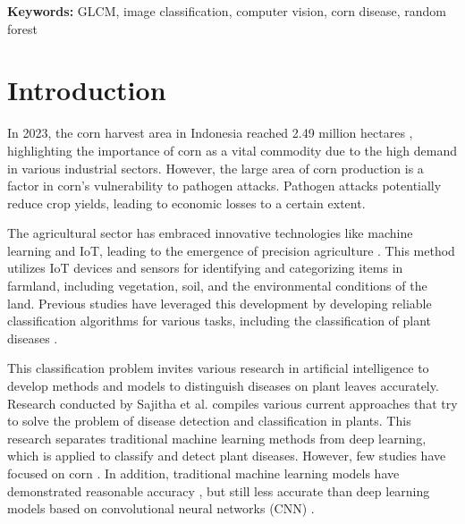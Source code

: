 \documentclass[10pt,a4paper]{article}
\begin{document}
\vspace{6pt}
\noindent\textbf{Keywords:} GLCM, image classification, computer vision, corn disease, random forest

\section{Introduction}

In 2023, the corn harvest area in Indonesia reached 2.49 million hectares \cite{bps}, highlighting the importance of corn as a vital commodity due to the high demand in various industrial sectors. However, the large area of corn production is a factor in corn's vulnerability to pathogen attacks. Pathogen attacks potentially reduce crop yields, leading to economic losses to a certain extent.

The agricultural sector has embraced innovative technologies like machine learning and IoT, leading to the emergence of precision agriculture \cite{Dhanaraju2022, Rehman2022}. This method utilizes IoT devices and sensors for identifying and categorizing items in farmland, including vegetation, soil, and the environmental conditions of the land. Previous studies have leveraged this development by developing reliable classification algorithms for various tasks, including the classification of plant diseases \cite{Ramesh2018,Sajitha2024}.

This classification problem invites various research in artificial intelligence to develop methods and models to distinguish diseases on plant leaves accurately. Research conducted by Sajitha et al. \cite{Sajitha2024} compiles various current approaches that try to solve the problem of disease detection and classification in plants. This research separates traditional machine learning methods from deep learning, which is applied to classify and detect plant diseases. However, few studies have focused on corn \cite{Pardede2018,Aurangzeb2020}. In addition, traditional machine learning models have demonstrated reasonable accuracy \cite{Harakannanavar2022, Wang2020}, but still less accurate than deep learning models based on convolutional neural networks (CNN) \cite{Shoaib2022, Kabir2021, Pandian2022}.
\end{document}
